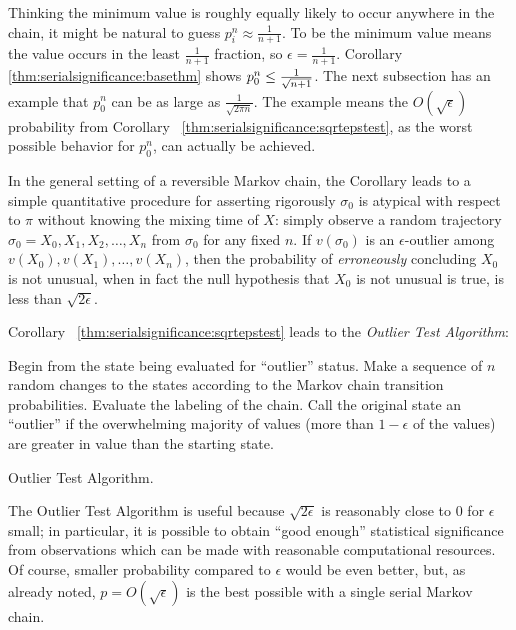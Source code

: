\documentclass[12pt]{article}
\begin{document}
Thinking the minimum value is roughly equally likely to occur anywhere
in the chain, it might be natural to guess \( p_i^n \approx \frac{1}{n+1}
\).  To be the minimum value means the value occurs in the least \(
\frac{1}{n+1} \) fraction, so \( \epsilon = \frac {1}{n+1} \).
Corollary~%
\ref{thm:serialsignificance:basethm} shows \( p_0^n \le \frac{1}{\sqrt
{%
n+1}} \).  The next subsection has an example that \( p_0^n \) can be as
large as \( \frac{1}{\sqrt{2\pi n}} \).  The example means the \( O (\sqrt
{\epsilon}) \) probability from Corollary~%
\ref{thm:serialsignificance:sqrtepstest}, as the worst possible behavior
for \( p_0^n \), can actually be achieved.

In the general setting of a reversible Markov chain, the Corollary leads
to a simple quantitative procedure for asserting rigorously \( \sigma_0 \)
is atypical with respect to \( \pi \) without knowing the mixing time of
\( X \):  simply observe a random trajectory \( \sigma_0 = X_0 , X_1, X_2,
\dots, X_n \) from \( \sigma_0 \) for any fixed \( n \).  If \( v(\sigma_0
) \) is an \( \epsilon \)-outlier among \( v(X_0), v(X_1), \dots, v(X_n)
\), then the probability of \emph{erroneously} concluding \( X_0 \) is
not unusual, when in fact the null hypothesis that \( X_0 \) is not
unusual is true, is less than \( \sqrt{2 \epsilon } \).

Corollary~%
\ref{thm:serialsignificance:sqrtepstest} leads to the \emph{Outlier Test
Algorithm}:%

\begin{algorithm}[H]
  \DontPrintSemicolon
   Begin from
  the state being evaluated for ``outlier'' status.\;
  Make a sequence of \( n \) random changes to the states according to the Markov
  chain transition probabilities.\;
  Evaluate the labeling of the chain.\;
  Call the original state an ``outlier'' if the overwhelming
  majority of values (more than \( 1 - \epsilon \) of the values) are
  greater in value than the starting state.\;
    \caption{Outlier Test Algorithm.}
\end{algorithm}

\begin{remark}
    The Outlier Test Algorithm is useful because \( \sqrt{2\epsilon} \)
    is reasonably close to \( 0 \) for \( \epsilon \) small; in
    particular, it is possible to obtain ``good enough'' statistical
    significance from observations which can be made with reasonable
    computational resources.  Of course, smaller probability compared to
    \( \epsilon \) would be even better, but, as already noted, \( p = O
    (\sqrt {\epsilon}) \) is the best possible with a single serial
    Markov chain.
\end{remark}
\end{document}
